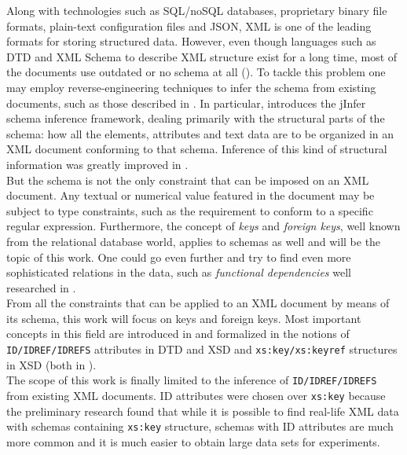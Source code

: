 \label{chapter-preface}

Along with technologies such as SQL/noSQL databases, proprietary binary file formats, plain-text configuration files and JSON, XML is one of the leading formats for storing structured data. However, even though languages such as DTD and XML Schema to describe XML structure exist for a long time, most of the documents use outdated or no schema at all (\cite{1802522}). To tackle this problem one may employ reverse-engineering techniques to infer the schema from existing documents, such as those described in \cite{ahonen, bex, vyhnanovska}. In particular, \cite{archdoc} introduces the jInfer schema inference framework, dealing primarily with the structural parts of the schema: how all the elements, attributes and text data are to be organized in an XML document conforming to that schema. Inference of this kind of structural information was greatly improved in \cite{anti}.\\

But the schema is not the only constraint that can be imposed on an XML document. Any textual or numerical value featured in the document may be subject to type constraints, such as the requirement to conform to a specific regular expression. Furthermore, the concept of \textit{keys} and \textit{foreign keys}, well known from the relational database world, applies to schemas as well and will be the topic of this work. One could go even further and try to find even more sophisticated relations in the data, such as \textit{functional dependencies} well researched in \cite{sviro}.\\

From all the constraints that can be applied to an XML document by means of its schema, this work will focus on keys and foreign keys. Most important concepts in this field are introduced in \cite{keX} and formalized in the notions of \texttt{ID/IDREF/IDREFS} attributes in DTD and XSD and \texttt{xs:key/xs:keyref} structures in XSD (both in \cite{Bray:08:EML}).\\

The scope of this work is finally limited to the inference of \texttt{ID/IDREF/IDREFS} from existing XML documents. ID attributes were chosen over \texttt{xs:key} because the preliminary research found that while it is possible to find real-life XML data with schemas containing \texttt{xs:key} structure, schemas with ID attributes are much more common and it is much easier to obtain large data sets for experiments. %

